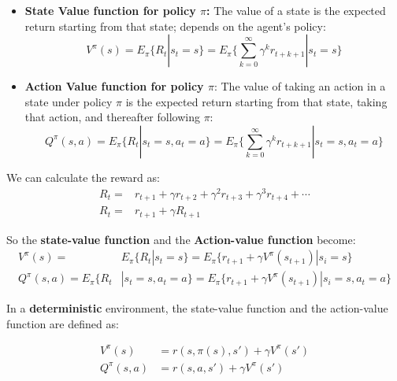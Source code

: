 \begin{itemize}
    \item \textbf{State Value function for policy $\pi$:} The value of a state is the expected return starting from that state; depends on the agent’s policy: 
    \begin{equation}
    V^{\pi} (s) = E_{\pi} \{ R_t | s_t = s \} = E_{\pi} \{ \sum _{k=0} ^{\infty} \gamma ^{k} r_{t+k+1} | s_t=s \}
    \end{equation}
    \item \textbf{Action Value function for policy $\pi$}: The value of taking an action in a state under policy $\pi$ is the expected return starting from that state, taking that action, and thereafter following $\pi$:
    \begin{equation}
        Q^{\pi} (s,a) = E_{\pi} \{ R_t | s_t = s, a_t =a \} = E_{\pi} \{ \sum _{k=0} ^{\infty} \gamma ^{k} r_{t+k+1} | s_t=s, a_t =a \}
    \end{equation}
\end{itemize}

We can calculate the reward as: 
\begin{equation}
\begin{aligned}
     R_t = &  r_{t+1} + \gamma r_{t+2} + \gamma ^{2} r_{t+3} + \gamma ^{3} r_{t+4} + \cdots
     \\     R_t = & r_{t+1} + \gamma R_{t+1}
\end{aligned}
\end{equation}
\vspace*{0.1cm}

So the \textbf{state-value function} and the \textbf{Action-value function} become: 
\begin{equation}
\begin{aligned}
        V^{\pi} (s) = & E_{\pi} \{ R_t | s_t = s \} = E_{\pi} \{ r_{t+1} + \gamma V^{\pi} (s_{t+1}) | s_i = s \} 
        \\     Q^{\pi} (s,a) = E_{\pi} \{ R_t & | s_t = s, a_t=a \} = E_{\pi} \{ r_{t+1} + \gamma V^{\pi} (s_{t+1}) | s_i = s, a_t=a \}
\end{aligned}
\end{equation}
\vspace*{0.1cm}

In a \textbf{deterministic} environment, the state-value function and the action-value function are defined as: 

\begin{equation}
\begin{aligned}
        V^{\pi} (s) & =  r(s, \pi (s) , s') + \gamma V^{\pi} (s')
  \\           Q^{\pi} (s,a) & =  r(s, a , s') + \gamma V^{\pi} (s')
\end{aligned}
\end{equation}


